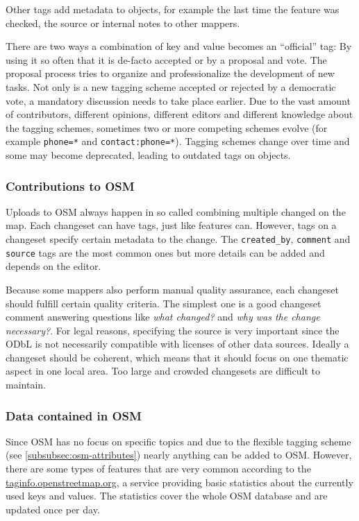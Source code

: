 			Other tags add metadata to objects, for example the last time the feature was checked, the source or internal notes to other mappers.
			
			There are two ways a combination of key and value becomes an \enquote{official} tag:
			By using it so often that it is de-facto accepted or by a proposal and vote.
			The proposal process tries to organize and professionalize the development of new tasks.
			Not only is a new tagging scheme accepted or rejected by a democratic vote, a mandatory discussion needs to take place earlier.
			Due to the vast amount of contributors, different opinions, different editors and different knowledge about the tagging schemes, sometimes two or more competing schemes evolve (for example \texttt{phone=*} and \texttt{contact:phone=*}).
			Tagging schemes change over time and some may become deprecated, leading to outdated tags on objects.
			
		\subsubsection{Contributions to OSM}
		
			Uploads to OSM always happen in so called  combining multiple changed on the map\cite{osm-wiki-changeset}.
			Each changeset can have tags, just like features can.
			However, tags on a changeset specify certain metadata to the change.
			The \texttt{created\_by}, \texttt{comment} and \texttt{source} tags are the most common ones but more details can be added and depends on the editor.
			
			Because some mappers also perform manual quality assurance, each changeset should fulfill certain quality criteria.
			The simplest one is a good changeset comment answering questions like \textit{what changed?} and \textit{why was the change necessary?}.
			For legal reasons, specifying the source is very important since the ODbL is not necessarily compatible with licenses of other data sources.
			Ideally a changeset should be coherent, which means that it should focus on one thematic aspect in one local area.
			Too large and crowded changesets are difficult to maintain.
			
		\subsubsection{Data contained in OSM}
		
			Since OSM has no focus on specific topics and due to the flexible tagging scheme (see \cref{subsubsec:osm-attributes}) nearly anything can be added to OSM.
			However, there are some types of features that are very common according to the \href{https://taginfo.openstreetmap.org/keys}{taginfo.openstreetmap.org}, a service providing basic statistics about the currently used keys and values\cite{taginfo-keys}.
			The statistics cover the whole OSM database and are updated once per day.
			
